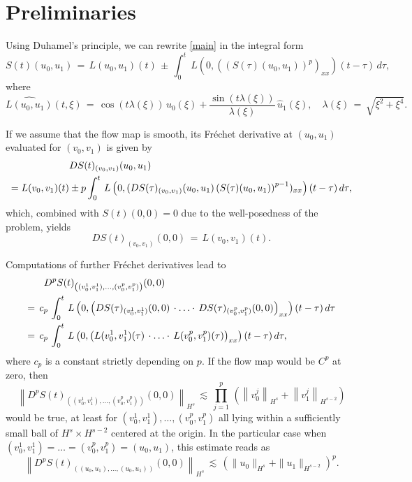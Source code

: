 \documentclass{amsart}
\begin{document}
\section{Preliminaries}
Using Duhamel's principle, we can rewrite \eqref{main} in the integral form
\begin{equation}
S(t)(u_0,u_1)\,=\,L(u_0,u_1)(t)\,\pm\, \int_0^t\,L \left( 0,\left((S(\tau)(u_0,u_1))^p\right)_{xx}\right)(t-\tau)\,d\tau,
\end{equation}
where
\begin{equation}
\widehat{L(u_0,u_1)}(t,\xi)\,=\,\cos(t \lambda(\xi))\, \widehat{u}_0(\xi)+\frac{\sin(t \lambda(\xi))}{\lambda(\xi)} \,\widehat{u}_1(\xi), \quad \lambda(\xi)\,=\,\sqrt{\xi^2+\xi^4}.
\label{L}
\end{equation}

If we assume that the flow map is smooth, its Fr\'{e}chet derivative at $(u_0,u_1)$ evaluated for $(v_0,v_1)$ is given by
\begin{equation}
\aligned
&DS(t)_{(v_0,v_1)}(u_0,u_1)\\
=L(v_0,v_1)(t)
&\pm p\int_0^t\,L \left( 0,(DS(\tau)_{(v_0,v_1)}(u_0,u_1)\left(S(\tau)(u_0,u_1)\right)^{p-1})_{xx}\right)(t-\tau)\,d\tau,
\endaligned\label{ds}
\end{equation}
which, combined with $S(t)(0,0)=0$ due to the well-posedness of the problem, yields
\begin{equation}
DS(t)_{(v_0,v_1)}(0,0)\,=\,L(v_0,v_1)(t).
\label{ds0}
\end{equation} 

Computations of further Fr\'{e}chet derivatives lead to 
\begin{equation}
\aligned
 D^pS(t)&_{\left((v^1_0,v^1_1),\ldots, (v^p_0,v^p_1)\right)}(0,0)\\
=\,c_p\,\int_0^t\,L& \left( 0,\left(DS(\tau)_{(v^1_0,v^1_1)}(0,0)\,\cdot \ldots\cdot\,DS(\tau)_{(v^p_0,v^p_1)}(0,0)\right)_{xx}\right)(t-\tau)\,d\tau\\
=\,c_p\,\int_0^t\,L& \left( 0,\left(L(v^1_0,v^1_1)(\tau)\,\cdot \ldots\cdot\,L(v^p_0,v^p_1)(\tau)\right)_{xx}\right)(t-\tau)\,d\tau,
\endaligned
\label{dps}
\end{equation}
where $c_p$ is a constant strictly depending on $p$. If the flow map would be $C^p$ at zero, 
then 
\begin{equation}
 \left\|D^pS(t)_{\left((v^1_0,v^1_1),\ldots, (v^p_0,v^p_1)\right)}(0,0)\right\|_{H^s}\,\lesssim\,\prod_{j=1}^{p}\, \left(\left\|v^j_0\right\|_{H^s}+\left\|v^j_1\right\|_{H^{s-2}}\right)
\end{equation}
would be true, at least for $(v^1_0,v^1_1),\ldots, (v^p_0,v^p_1)$ all lying within a sufficiently small ball of $ H^s\times H^{s-2}$ centered at the origin. In the particular case when $(v^1_0,v^1_1)=\ldots= (v^p_0,v^p_1)=(u_0,u_1)$, this estimate reads as
\begin{equation}
 \left\|D^pS(t)_{\left((u_0,u_1),\ldots, (u_0,u_1)\right)}(0,0)\right\|_{H^s}\,\lesssim\,\left(\|u_0\|_{H^s}+\|u_1\|_{H^{s-2}}\right)^p.
\end{equation}
\end{document}
